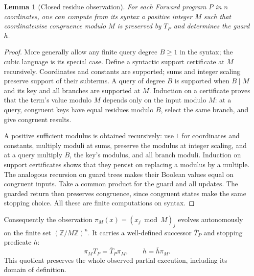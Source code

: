 \documentclass[11pt]{article}
\numberwithin{equation}{section}
\newtheorem{lemma}[theorem]{Lemma}
\theoremstyle{definition}
\theoremstyle{remark}
\newcommand{\Z}{\mathbb Z}
\begin{document}
\begin{lemma}[Closed residue observation]\label{lem:forward-residue}
For each Forward program $P$ in $n$ coordinates, one can compute from
its syntax a positive integer $M$ such that coordinatewise congruence
modulo $M$ is preserved by $T_P$ and determines the guard $h$.
\end{lemma}
\begin{proof}
More generally allow any finite query degree $B\geq1$ in the syntax;
the cubic language is its special case. Define a syntactic support
certificate at $M$ recursively. Coordinates and constants are supported;
sums and integer scaling preserve support of their subterms. A query
of degree $B$ is supported when $B\mid M$ and its key and all branches
are supported at $M$. Induction on a certificate proves that the
term's value modulo $M$ depends only on the input modulo $M$: at a
query, congruent keys have equal residues modulo $B$, select the same
branch, and give congruent results.

A positive sufficient modulus is obtained recursively: use $1$ for
coordinates and constants, multiply moduli at sums, preserve the
modulus at integer scaling, and at a query multiply $B$, the key's
modulus, and all branch moduli. Induction on support certificates
shows that they persist on replacing a modulus by a multiple.
The analogous recursion on guard trees makes
their Boolean values equal on congruent inputs. Take a common product
for the guard and all updates. The guarded return then preserves
congruence, since congruent states make the same stopping choice.
All these are finite computations on syntax.
\end{proof}

Consequently the observation $\pi_M(x)=(x_j\bmod M)_j$ evolves
autonomously on the finite set $(\Z/M\Z)^n$. It carries a well-defined
successor $\overline T_P$ and stopping predicate $\overline h$:
\[
 \pi_M T_P=\overline T_P\pi_M,\qquad
 h=\overline h\pi_M.
\]
This quotient preserves the whole observed partial execution, including
its domain of definition.
\end{document}
